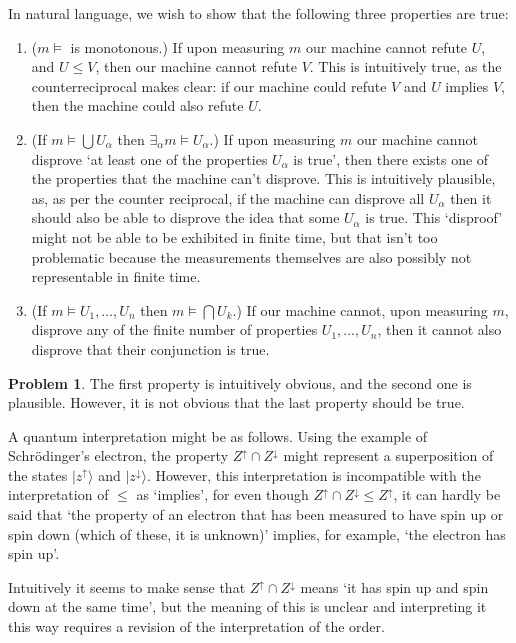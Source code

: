 \documentclass{article}
\theoremstyle{definition}
\newtheorem{problem}{Problem}
\theoremstyle{plain}
\begin{document}
In natural language, we wish to show that the following three properties are true:
\begin{enumerate}
\item ($m\vDash$ is monotonous.) If upon measuring $m$ our machine cannot refute $U$, and $U \leq V$, then our machine cannot refute $V$. This is intuitively true, as the counterreciprocal makes clear: if our machine could refute $V$ and $U$ implies $V$, then the machine could also refute $U$.

\item (If $m\vDash \bigcup U_\alpha$ then $\exists_\alpha m \vDash U_\alpha$.) If upon measuring $m$ our machine cannot disprove `at least one of the properties $U_\alpha$ is true', then there exists one of the properties that the machine can't disprove. This is intuitively plausible, as, as per the counter reciprocal, if the machine can disprove all $U_\alpha$ then it should also be able to disprove the idea that some $U_\alpha$ is true. This `disproof' might not be able to be exhibited in finite time, but that isn't too problematic because the measurements themselves are also possibly not representable in finite time.

\item (If $m\vDash U_1, \dots, U_n$ then $m \vDash \bigcap U_k$.) If our machine cannot, upon measuring $m$, disprove any of the finite number of properties $U_1, \dots, U_n$, then it cannot also disprove that their conjunction is true.
\end{enumerate}

\begin{problem}\label{probhom}
The first property is intuitively obvious, and the second one is plausible. However, it is not obvious that the last property should be true.

A quantum interpretation might be as follows. Using the example of Schrödinger's electron, the property $Z^\uparrow \cap Z^\downarrow$ might represent a superposition of the states $\lvert z^\uparrow \rangle$ and $\lvert z^\downarrow \rangle$. However, this interpretation is incompatible with the interpretation of $\leq$ as `implies', for even though $Z^\uparrow \cap Z^\downarrow \leq Z^\uparrow$, it can hardly be said that `the property of an electron that has been measured to have spin up or spin down (which of these, it is unknown)' implies, for example, `the electron has spin up'. 

Intuitively it seems to make sense that $Z^\uparrow \cap Z^\downarrow$ means `it has spin up and spin down at the same time', but the meaning of this is unclear and interpreting it this way requires a revision of the interpretation of the order.
\end{problem}
\end{document}
